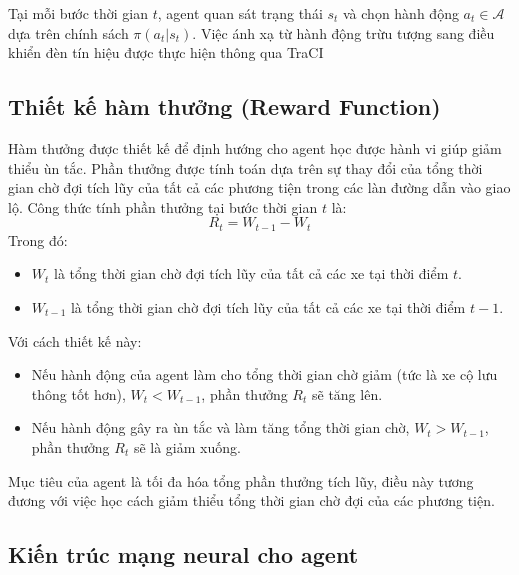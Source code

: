 Tại mỗi bước thời gian $t$, agent quan sát trạng thái $s_t$ và chọn hành động $a_t \in \mathcal{A}$ dựa trên chính sách $\pi(a_t|s_t)$. Việc ánh xạ từ hành động trừu tượng sang điều khiển đèn tín hiệu được thực hiện thông qua TraCI



\subsection{Thiết kế hàm thưởng (Reward Function)}
Hàm thưởng được thiết kế để định hướng cho agent học được hành vi giúp giảm thiểu ùn tắc. Phần thưởng được tính toán dựa trên sự thay đổi của tổng thời gian chờ đợi tích lũy của tất cả các phương tiện trong các làn đường dẫn vào giao lộ. Công thức tính phần thưởng tại bước thời gian $t$ là:
\[
    R_{t} = W_{t-1}- W_{t}
\]
Trong đó:
\begin{itemize}
    \item $W_{t}$ là tổng thời gian chờ đợi tích lũy của tất cả các xe tại thời điểm
        $t$.

    \item $W_{t-1}$ là tổng thời gian chờ đợi tích lũy của tất cả các xe tại thời
        điểm $t-1$.
\end{itemize}
Với cách thiết kế này:
\begin{itemize}
    \item Nếu hành động của agent làm cho tổng thời gian chờ giảm (tức là xe cộ
        lưu thông tốt hơn), $W_{t} < W_{t-1}$, phần thưởng $R_{t}$ sẽ tăng lên.

    \item Nếu hành động gây ra ùn tắc và làm tăng tổng thời gian chờ,
        $W_{t} > W_{t-1}$, phần thưởng $R_{t}$ sẽ là giảm xuống.
\end{itemize}
Mục tiêu của agent là tối đa hóa tổng phần thưởng tích lũy, điều này tương đương với việc học cách giảm thiểu tổng thời gian chờ đợi của các phương tiện.

\subsection{Kiến trúc mạng neural cho agent}

